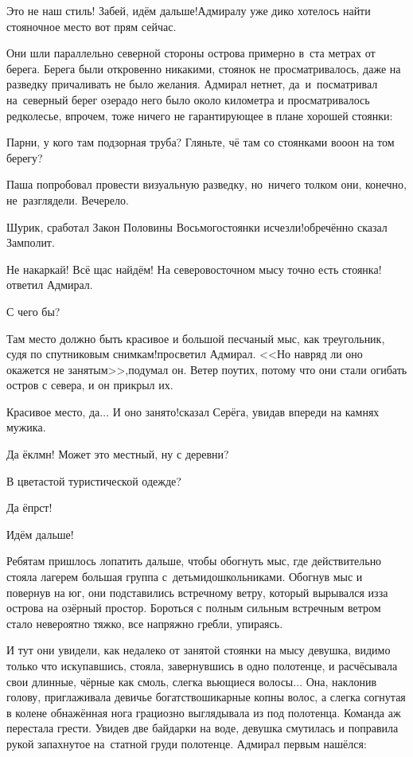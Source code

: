 \diagdash Это не наш стиль! Забей, идём дальше!\mdash Адмиралу уже дико хотелось найти стояночное место вот прям сейчас. 

Они шли параллельно северной стороны острова примерно в~ста метрах от берега. Берега были откровенно никакими, стоянок не просматривалось, даже на разведку причаливать не было желания. Адмирал нет\sdash нет, да~и~посматривал на~северный берег озера\mdash до него было около километра и просматривалось редколесье, впрочем, тоже ничего не гарантирующее в плане хорошей стоянки:

\diagdash Парни, у кого там подзорная труба? Гляньте, чё там со стоянками во\sdash о\sdash он на том берегу?

Паша попробовал провести визуальную разведку, но~ничего толком они, конечно, не~разглядели. Вечерело.

\diagdash Шурик, сработал Закон Половины Восьмого\cite{Квадригин}\mdash стоянки исчезли!\mdash обречённо сказал Замполит.

\diagdash Не накаркай! Всё щас найдём! На северо\sdash восточном мысу точно есть стоянка!\mdash ответил Адмирал.

\diagdash С чего бы?

\diagdash Там место должно быть красивое и большой песчаный мыс, как треугольник, судя по спутниковым снимкам!\mdash просветил Адмирал. <<Но навряд ли оно окажется не занятым>>,\mdash подумал он. Ветер поутих, потому что они стали огибать остров с севера, и он прикрыл их.

\diagdash Красивое место, да$\ldots$ И оно занято!\mdash сказал Серёга, увидав впереди на камнях мужика.

\diagdash Да ёклмн! Может это местный, ну с деревни?

\diagdash В цветастой туристической одежде?

\diagdash Да ёпрст!

\diagdash Идём дальше!

Ребятам пришлось лопатить дальше, чтобы обогнуть мыс, где действительно стояла лагерем большая группа с~детьми\sdash дошкольниками. Обогнув мыс и повернув на юг, они подставились встречному ветру, который вырывался из\sdash за острова на озёрный простор. Бороться с полным сильным встречным ветром стало невероятно тяжко, все напряжно гребли, упираясь.

И тут они увидели, как недалеко от занятой стоянки на мысу девушка, видимо только что искупавшись, стояла, завернувшись в одно полотенце, и расчёсывала свои длинные, чёрные как смоль, слегка вьющиеся волосы$\ldots$ Она, наклонив голову, приглаживала девичье богатство\mdash шикарные копны волос, а слегка согнутая в колене обнажённая нога грациозно выглядывала из под полотенца. Команда аж перестала грести. Увидев две байдарки на воде, девушка смутилась и поправила рукой запахнутое на~статной груди полотенце. Адмирал первым нашёлся:

